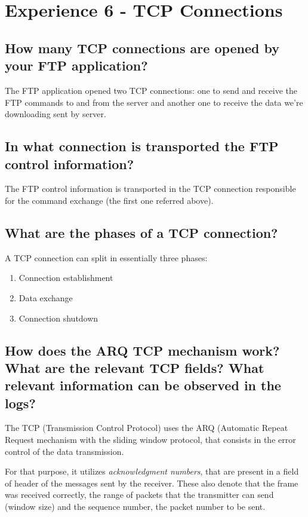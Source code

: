 \documentclass[11pt]{report}
\begin{document}
\newpage

\section{Experience 6 - TCP Connections}

\subsection{How many TCP connections are opened by your FTP application?}

The FTP application opened two TCP connections: one to send and receive the FTP commands to and from the server and another one to receive the data we're downloading sent by server.


\subsection{In what connection is transported the FTP control information?}

The FTP control information is transported in the TCP connection responsible for the command exchange (the first one referred above).

\subsection{What are the phases of a TCP connection?}

A TCP connection can split in essentially three phases:

\begin{enumerate}
    \item Connection establishment
    \item Data exchange
    \item Connection shutdown
\end{enumerate}

\subsection{How does the ARQ TCP mechanism work? What are the relevant TCP
fields? What relevant information can be observed in the logs?}

The TCP (Transmission Control Protocol) uses the ARQ (Automatic Repeat Request mechanism with the sliding window protocol, that consists in the error control of the data transmission.

For that purpose, it utilizes \textit{acknowledgment numbers}, that are present in a field of header of the messages sent by the receiver. These also denote that the frame was received correctly, the range of packets that the transmitter can send (window size) and the sequence number, the packet number to be sent.
\end{document}
